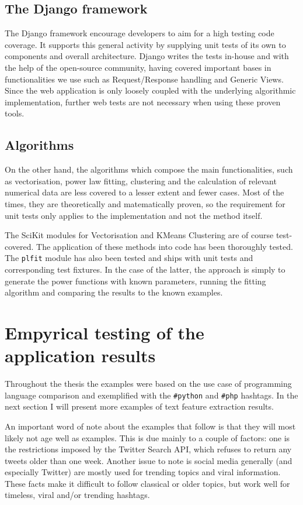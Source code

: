 \documentclass[12pt,a4paper,twoside]{report}
\begin{document}
\subsection{The Django framework}
The Django framework encourage developers to aim for a high testing code coverage. It supports this general activity by supplying unit tests of its own to components and overall architecture. Django writes the tests in-house and with the help of the open-source community, having covered important bases in functionalities we use such as Request/Response handling and Generic Views. Since the web application is only loosely coupled with the underlying algorithmic implementation, further web tests are not necessary when using these proven tools.

\subsection{Algorithms}
On the other hand, the algorithms which compose the main functionalities, such as vectorisation, power law fitting, clustering and the calculation of relevant numerical data are less covered to a lesser extent and fewer cases. Most of the times, they are theoretically and matematically proven, so the requirement for unit tests only applies to the implementation and not the method itself.

The SciKit modules for Vectorisation and KMeans Clustering are of course test-covered. The application of these methods into code has been thoroughly tested. The \texttt{plfit} module has also been tested and ships with unit tests and corresponding test fixtures. In the case of the latter, the approach is simply to generate the power functions with known parameters, running the fitting algorithm and comparing the results to the known examples.

\section{Empyrical testing of the application results}
Throughout the thesis the examples were based on the use case of programming language comparison and exemplified with the \texttt{\#python} and \texttt{\#php} hashtags. In the next section I will present more examples of text feature extraction results.

An important word of note about the examples that follow is that they will most likely not age well as examples. This is due mainly to a couple of factors: one is the restrictions imposed by the Twitter Search API, which refuses to return any tweets older than one week. Another issue to note is social media generally (and especially Twitter) are mostly used for trending topics and viral information. These facts make it difficult to follow classical or older topics, but work well for timeless, viral and/or trending hashtags.
\end{document}
